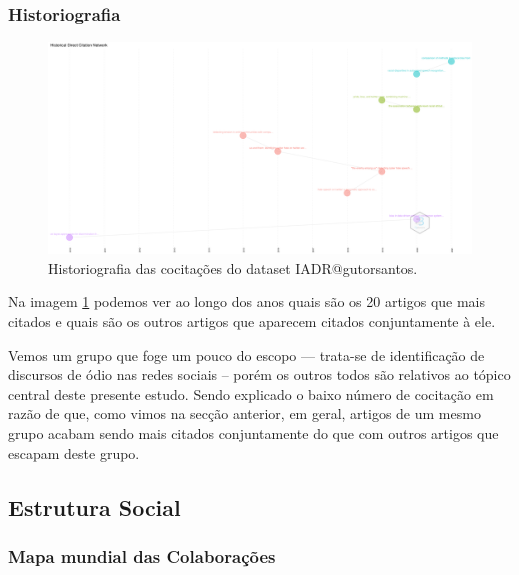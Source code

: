 \subsubsection{Historiografia}
\begin{figure}
    \centering
\includegraphics[angle=0,width=1\textwidth]{experiments/gutorsantos/AnaliseBibliometrica/IAeDiscriminacao/imgs/Historiograph-2022-02-09.png}
    \caption{Historiografia das cocitações do dataset IADR@gutorsantos.}
    \label{fig:IADR@gutorsantos:Historiograph}
\end{figure}

Na imagem \ref{fig:IADR@gutorsantos:Historiograph} podemos ver ao longo dos anos quais são os 20 artigos que mais citados e quais são os outros artigos que aparecem citados  conjuntamente à ele. 

Vemos um grupo que foge um pouco do escopo --- trata-se de identificação de discursos de ódio nas redes sociais -- porém os outros todos são relativos ao tópico central deste presente estudo. Sendo explicado o baixo número de cocitação em razão de que, como vimos na secção anterior, em geral, artigos de um mesmo grupo acabam sendo mais citados conjuntamente do que com outros artigos que escapam deste grupo.


\subsection{Estrutura Social}

\subsubsection{Mapa mundial das Colaborações}


